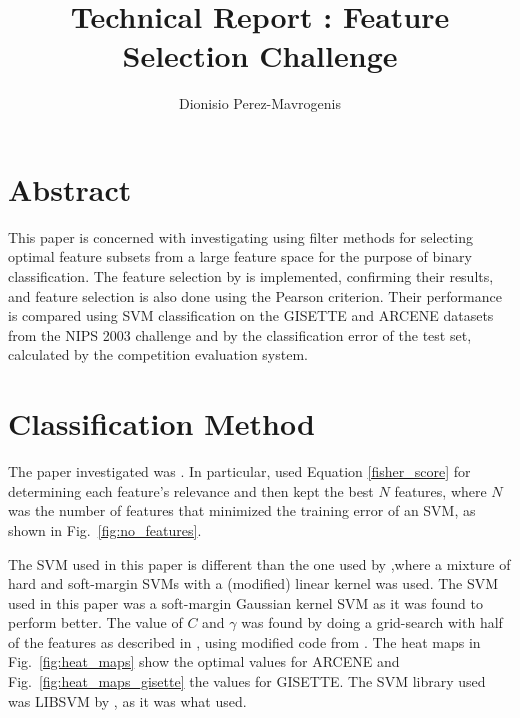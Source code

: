 \documentclass[12pt,a4paper,twocolumn]{article}
\author{Dionisio Perez-Mavrogenis}
\title{{Technical Report : Feature Selection Challenge}}
\begin{document}
\maketitle
\section{Abstract}
This paper is concerned with investigating using filter methods for selecting optimal feature subsets from a large feature space for the purpose of binary classification. The feature selection by \citep{filter_svms} is implemented, confirming their results, and feature selection is also done using the Pearson criterion. Their performance is compared using SVM classification on the GISETTE and ARCENE datasets from the NIPS 2003 challenge and by the classification error of the test set, calculated by the competition evaluation system.

\section{Classification Method}
The paper investigated was \citep{filter_svms}. In particular, \citep{filter_svms} used Equation \ref{fisher_score} for determining each feature's relevance and then kept the best $N$ features, where $N$ was the number of features that minimized the training error of an SVM, as shown in Fig.~\ref{fig:no_features}. 

The SVM used in this paper is different than the one used by \citep{filter_svms},where a mixture of hard and soft-margin SVMs with a (modified) linear kernel was used. The SVM used in this paper was a soft-margin Gaussian kernel SVM as it was found to perform better. The value of $C$ and $\gamma$ was found by doing a grid-search with half of the features as described in \citep{grid_search}, using modified code from \citep{website:kitipat_heatmap}. The heat maps in Fig.~\ref{fig:heat_maps} show the optimal values for ARCENE and Fig.~\ref{fig:heat_maps_gisette} the values for GISETTE. The SVM library used was LIBSVM by \citep{libsvm}, as it was what \citep{filter_svms} used.
\end{document}
